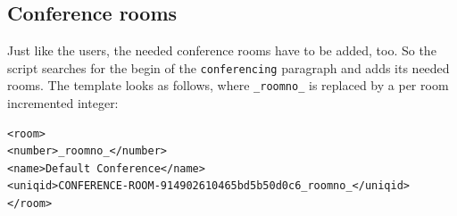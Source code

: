 \subsection{Conference rooms}
Just like the users, the needed conference rooms have to be added, too. So the script searches for the begin of the \texttt{conferencing}
paragraph and adds its needed rooms. The template looks as follows, where \texttt{\_roomno\_} is replaced by a per room incremented integer:
\begin{lstlisting}[breaklines=true,label=code:config-post-request,caption={Conference room template} ]
<room>
<number>_roomno_</number>
<name>Default Conference</name>
<uniqid>CONFERENCE-ROOM-914902610465bd5b50d0c6_roomno_</uniqid>
</room>
\end{lstlisting}

